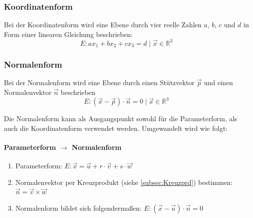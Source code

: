 \documentclass[a4paper,10pt,DIV9, BCOR12mm, oneside,openright,openbib]{scrreprt}
\theoremstyle{definition}
\theoremstyle{plain}
\begin{document}
\subsubsection{Koordinatenform}  
Bei der Koordinatenform wird eine Ebene durch vier reelle Zahlen $a$, $b$, $c$ und $d$ in Form einer linearen Gleichung beschrieben:
    \[E: ax_{1}+bx_{2}+cx_{3}=d \mid {\vec x}\in \mathbb{R}^{3}\]
    
\subsubsection{Normalenform}  
Bei der Normalenform wird eine Ebene durch einen Stützvektor ${\vec p}$ und einen Normalenvektor ${\vec n}$ beschrieben
    \[E: ({\vec x}-{\vec p})\cdot {\vec n}=0 \mid {\vec x}\in \mathbb{R} ^{3}\]
    
Die Normalenform kann als Ausgangspunkt sowohl für die Parameterform, als auch die Koordinatenform verwendet werden. Umgewandelt wird wie folgt:
\paragraph{Parameterform $\longrightarrow$ Normalenform}
\begin{enumerate}
 \item Parameterform: $E: \overrightarrow{x} = \overrightarrow{u} + r \cdot \overrightarrow{v} + s \cdot \overrightarrow{w}$
 \item Normalenvektor per Kreuzprodukt (siehe \ref{subsec:Kreuzprd}) bestimmen: $\vec{n} = \vec{v}\times\vec{w}$
 \item Normalenform bildet sich folgendermaßen: $E: ({\vec x}-{\vec u})\cdot {\vec n}=0$
\end{enumerate}
\end{document}
